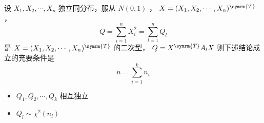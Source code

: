   设 $ X_1, X_2, \cdots, X_n $ 独立同分布，服从 $ N(0,1) $ ， $ X = (X_1, X_2, \cdots, X_n)^{\symrm{T}} $ ，
$$ Q = \sum_{i=1}^{n}X_{i}^{2} = \sum_{l=1}^{n}Q_l $$ 是 $ X = (X_1, X_2, \cdots, X_n)^{\symrm{T}} $ 的二次型，
$ Q = X^{\symrm{T}}A_l X $ 则下述结论成立的充要条件是 $$ n = \sum_{i=1}^{k} n_i $$
\begin{itemize}[leftmargin=\paritemindent]
    \item $ Q_1, Q_2, \cdots, Q_k $ 相互独立
    \item $ Q_l \sim \chi^2(n_l) $
\end{itemize}

